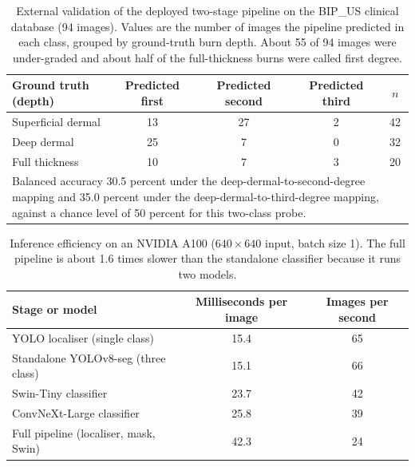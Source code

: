 \documentclass{elektr}
\newcommand{\vs}{\vspace}
\begin{document}
\begin{table}[!ht]
\caption{External validation of the deployed two-stage pipeline on the BIP\_US clinical database (94 images). Values are the number of images the pipeline predicted in each class, grouped by ground-truth burn depth. About 55 of 94 images were under-graded and about half of the full-thickness burns were called first degree.}
\begin{center}
\small
\begin{tabular}{|l|c|c|c|c|}
\hline
Ground truth (depth) & Predicted first & Predicted second & Predicted third & $n$ \\
\hline
Superficial dermal & 13 & 27 & 2 & 42 \\
Deep dermal & 25 & 7 & 0 & 32 \\
Full thickness & 10 & 7 & 3 & 20 \\
\hline
\multicolumn{5}{|p{0.9\textwidth}|}{Balanced accuracy 30.5 percent under the deep-dermal-to-second-degree mapping and 35.0 percent under the deep-dermal-to-third-degree mapping, against a chance level of 50 percent for this two-class probe.} \\
\hline
\end{tabular}
\label{tab:ext}
\end{center}\vs{-4mm}
\end{table}


\begin{table}[!ht]
\caption{Inference efficiency on an NVIDIA A100 ($640\times640$ input, batch size 1). The full pipeline is about 1.6 times slower than the standalone classifier because it runs two models.}
\begin{center}
\small
\begin{tabular}{|l|c|c|}
\hline
Stage or model & Milliseconds per image & Images per second \\
\hline
YOLO localiser (single class) & 15.4 & 65 \\
Standalone YOLOv8-seg (three class) & 15.1 & 66 \\
Swin-Tiny classifier & 23.7 & 42 \\
ConvNeXt-Large classifier & 25.8 & 39 \\
Full pipeline (localiser, mask, Swin) & 42.3 & 24 \\
\hline
\end{tabular}
\label{tab:eff}
\end{center}\vs{-4mm}
\end{table}


\end{document}
